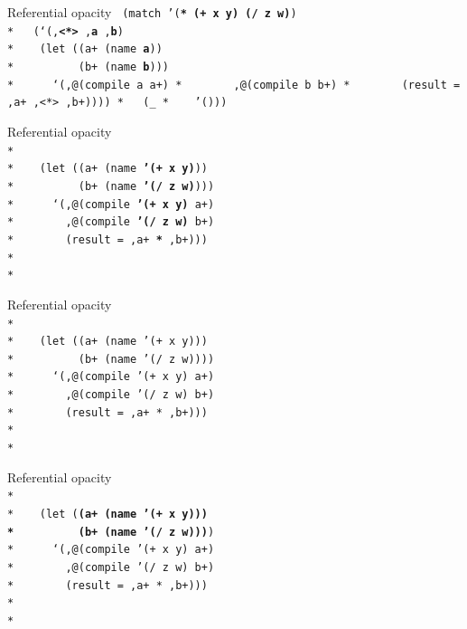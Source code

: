 \documentclass{beamer}
\begin{document}
\begin{frame}{Referential opacity}
  \texttt{
    (match '(\textbf{*} \textbf{(+ x y)} \textbf{(/ z w)})\\*
    \ \ (`(,\textbf{<*>} ,\textbf{a} ,\textbf{b})\\*
    \ \ \ (let ((a+ (name \textbf{a}))\\*
    \ \ \ \ \ \ \ \ \ (b+ (name \textbf{b})))\\*
    \ \ \ \ \ `(,@(compile \textbf{a} a+)\\*
    \ \ \ \ \ \ \ ,@(compile \textbf{b} b+)\\*
    \ \ \ \ \ \ \ (result = ,a+ ,\textbf{<*>} ,b+))))\\*
    \ \ (\_\\*
    \ \ \ '()))
}
\end{frame}

\begin{frame}{Referential opacity}
  \texttt{
    \ \\*
    \ \\*
    \ \ \ (let ((a+ (name \textbf{'(+ x y)}))\\*
    \ \ \ \ \ \ \ \ \ (b+ (name \textbf{'(/ z w)})))\\*
    \ \ \ \ \ `(,@(compile \textbf{'(+ x y)} a+)\\*
    \ \ \ \ \ \ \ ,@(compile \textbf{'(/ z w)} b+)\\*
    \ \ \ \ \ \ \ (result = ,a+ \textbf{*} ,b+))) \\*
    \ \\*
    \ 
  }
\end{frame}


\begin{frame}{Referential opacity}
  \texttt{
    \ \\*
    \ \\*
    \ \ \ (let ((a+ (name '(+ x y)))\\*
    \ \ \ \ \ \ \ \ \ (b+ (name '(/ z w))))\\*
    \ \ \ \ \ `(,@(compile '(+ x y) a+)\\*
    \ \ \ \ \ \ \ ,@(compile '(/ z w) b+)\\*
    \ \ \ \ \ \ \ (result = ,a+ * ,b+))) \\*
    \ \\*
    \ 
  }
\end{frame}

\begin{frame}{Referential opacity}
  \texttt{
    \ \\*
    \ \\*
    \ \ \ (let (\textbf{(a+ (name '(+ x y))) \\*
      \ \ \ \ \ \ \ \ \ (b+ (name '(/ z w)))})\\*
    \ \ \ \ \ `(,@(compile '(+ x y) a+)\\*
    \ \ \ \ \ \ \ ,@(compile '(/ z w) b+)\\*
    \ \ \ \ \ \ \ (result = ,a+ * ,b+))) \\*
    \ \\*
    \ 
  }
\end{frame}
\end{document}
